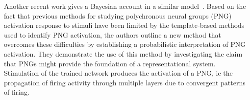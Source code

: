 \documentclass[brainsci, %
               review,submit,pdftex,moreauthors%
               ]{Definitions/mdpi}
\begin{document}
Another recent work gives a Bayesian account in a similar model~\citep{guise_bayesian_2014}. Based on the fact that previous methods for studying polychronous neural groups (PNG) activation response to stimuli have been limited by the template-based methods used to identify PNG activation, the authors outline a new method that overcomes these difficulties by establishing a probabilistic interpretation of PNG activation. They demonstrate the use of this method by investigating the claim that PNGs might provide the foundation of a representational system. Stimulation of the trained network produces the activation of a PNG, ie the propagation of firing activity through multiple layers due to convergent patterns of firing.

\end{document}
